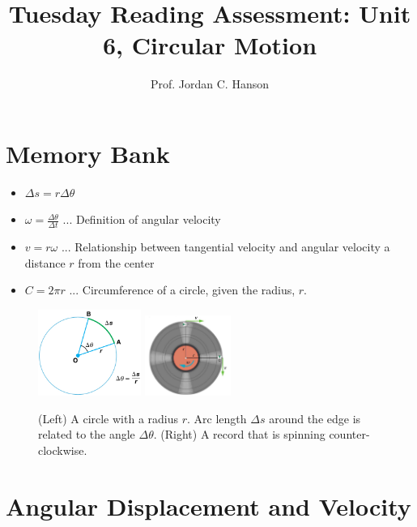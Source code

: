\documentclass{article}
\begin{document}
\title{Tuesday Reading Assessment: Unit 6, Circular Motion}
\author{Prof. Jordan C. Hanson}

\maketitle

\section{Memory Bank}

\begin{itemize}
\item $\Delta s = r \Delta \theta$
\item $\omega = \frac{\Delta \theta}{\Delta t}$ ... Definition of angular velocity
\item $v = r\omega $ ... Relationship between tangential velocity and angular velocity a distance $r$ from the center
\item $C = 2\pi r$ ... Circumference of a circle, given the radius, $r$.
\end{itemize}

\begin{figure}[ht]
\centering
\includegraphics[width=0.3\textwidth]{circle.jpeg}
\includegraphics[width=0.25\textwidth]{record.png}
\caption{\label{fig:record} (Left) A circle with a radius $r$.  Arc length $\Delta s$ around the edge is related to the angle $\Delta \theta$.  (Right) A record that is spinning counter-clockwise.}
\end{figure}

\section{Angular Displacement and Velocity}
\end{document}
